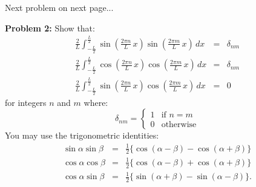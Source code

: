 \documentclass[12pt]{article}
\begin{document}
\vskip 1cm
\begin{center}
Next problem on next page...
\end{center}

\newpage
\noindent
{\bf Problem 2:}  Show that:
\begin{eqnarray*}
\frac{2}{L} \int_{-\frac{L}{2}}^{\frac{L}{2}} 
\sin\left(\frac{2\pi n}{L} \, x \right) \sin\left(\frac{2\pi m}{L} \, x \right) \, dx &=& \delta_{nm} \label{eqn:trigortha} \\
 \frac{2}{L} \int_{-\frac{L}{2}}^{\frac{L}{2}} 
\cos\left(\frac{2\pi n}{L} \, x \right) \cos\left(\frac{2\pi m}{L} \, x \right) \, dx &=& \delta_{nm} \label{eqn:trigorthb}\\
\frac{2}{L} \int_{-\frac{L}{2}}^{\frac{L}{2}} 
\sin\left(\frac{2\pi n}{L} \, x \right) \cos\left(\frac{2\pi m}{L} \, x \right) \, dx &=& 0 \label{eqn:trigorthc}
\end{eqnarray*}
for integers $n$ and $m$ where:
\begin{displaymath}
\delta_{nm} =  
\left\{
        \begin{array}{ll}
                1  & \mbox{if } n=m \\
                0 & \mbox{otherwise}
        \end{array}
\right.
\end{displaymath}
You may use the trigonometric identities:
\begin{eqnarray*}
\sin \alpha \sin \beta &=& \frac{1}{2} \{\cos(\alpha - \beta) - \cos(\alpha + \beta)\}\\
\cos \alpha \cos \beta &=& \frac{1}{2} \{\cos(\alpha - \beta) + \cos(\alpha + \beta)\}\\
\cos \alpha \sin \beta &=& \frac{1}{2} \{\sin(\alpha + \beta) - \sin(\alpha - \beta)\}.\\
\end{eqnarray*}
\end{document}
